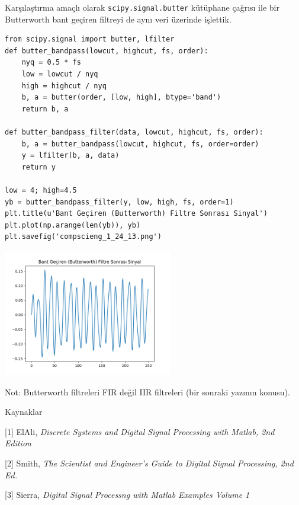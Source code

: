 \documentclass[12pt,fleqn]{article}\usepackage{../../common}
\begin{document}
Karşılaştırma amaçlı olarak \verb!scipy.signal.butter! kütüphane çağrısı
ile bir Butterworth bant geçiren filtreyi de aynı veri üzerinde işlettik.

\begin{verbatim}
from scipy.signal import butter, lfilter
def butter_bandpass(lowcut, highcut, fs, order):
    nyq = 0.5 * fs
    low = lowcut / nyq
    high = highcut / nyq
    b, a = butter(order, [low, high], btype='band')
    return b, a

def butter_bandpass_filter(data, lowcut, highcut, fs, order):
    b, a = butter_bandpass(lowcut, highcut, fs, order=order)
    y = lfilter(b, a, data)
    return y

low = 4; high=4.5
yb = butter_bandpass_filter(y, low, high, fs, order=1)
plt.title(u'Bant Geçiren (Butterworth) Filtre Sonrası Sinyal')
plt.plot(np.arange(len(yb)), yb)
plt.savefig('compscieng_1_24_13.png')
\end{verbatim}

\includegraphics[width=20em]{compscieng_1_24_13.png}

Not: Butterworth filtreleri FIR değil IIR filtreleri (bir sonraki yazının konusu).

Kaynaklar

[1] ElAli, {\em Discrete Systems and Digital Signal Processing with Matlab, 2nd Edition}

[2] Smith, {\em The Scientist and Engineer's Guide to Digital Signal Processing, 2nd Ed.}

[3] Sierra, {\em Digital Signal Processng with Matlab Examples Volume 1}
\end{document}
